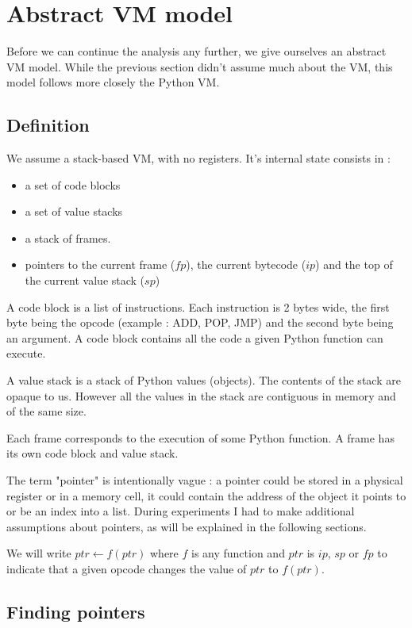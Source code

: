 \documentclass[french]{article}
\begin{document}
\section{Abstract VM model}

Before we can continue the analysis any further, we give ourselves an abstract VM model. While the previous section didn't assume much about the VM, this model follows more closely the Python VM.
\subsection{Definition}

We assume a stack-based VM, with no registers. It's internal state consists in :
\begin{itemize}
	\item a set of code blocks 
	\item a set of value stacks 
	\item a stack of frames.  
	\item pointers to the current frame ($fp$), the current bytecode ($ip$) and the top of the current value stack ($sp$)
\end{itemize}

A code block is a list of instructions. Each instruction is 2 bytes wide, the first byte being the opcode (example : ADD, POP, JMP) and the second byte being an argument. A code block contains all the code a given Python function can execute.

A value stack is a stack of Python values (objects). The contents of the stack are opaque to us. However all the values in the stack are contiguous in memory and of the same size.

Each frame corresponds to the execution of some Python function. A frame has its own code block and value stack.

The term "pointer" is intentionally vague : a pointer could be stored in a physical register or in a memory cell, it could contain the address of the object it points to or be an index into a list. During experiments I had to make additional assumptions about pointers, as will be explained in the following sections.

We will write $ptr \leftarrow f(ptr)$ where $f$ is any function and $ptr$ is $ip$, $sp$ or $fp$ to indicate that a given opcode changes the value of $ptr$ to $f(ptr)$.

\subsection{Finding pointers}
\end{document}
